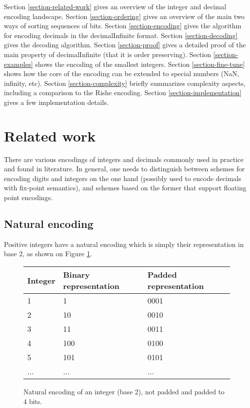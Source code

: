 \documentclass{acm_proc_article-sp}
\begin{document}
Section \ref{section-related-work} gives an overview of the integer and decimal encoding landscape.
Section \ref{section-ordering} gives an overview of the main two ways of sorting sequences of bits.
Section \ref{section-encoding} gives the algorithm for encoding decimals in the decimalInfinite format.
Section \ref{section-decoding} gives the decoding algorithm.
Section \ref{section-proof} gives a detailed proof of the main property of decimalInfinite (that it is order preserving).
Section \ref{section-examples} shows the encoding of the smallest integers.
Section \ref{section-fine-tune} shows how the core of the encoding can be extended to special numbers (NaN, infinity, etc).
Section \ref{section-complexity} briefly summarizes complexity aspects, including a comparison to the Rishe encoding.
Section \ref{section-implementation} gives a few implementation details.

\section{Related work}

There are various encodings of integers and decimals commonly used in practice and found in literature. In general, one needs to distinguish between schemes for encoding digits and integers on the one hand (possibly used to encode decimals with fix-point semantics), and schemes based on the former that support floating point encodings.

\label{section-related-work}

\subsection{Natural encoding}

Positive integers have a natural encoding which is simply their representation in base 2, as shown on Figure \ref{figure-natural-encoding}.

\begin{figure}
\caption{Natural encoding of an integer (base 2), not padded and padded to 4 bits.}
\label{figure-natural-encoding}
\center
\begin{tabular}{|l|l|l|}
\hline
Integer & Binary representation & Padded representation \\
\hline
1 & 1 & 0001 \\
\hline
2 & 10 & 0010 \\
\hline
3 & 11 & 0011\\
\hline
4 & 100  & 0100 \\
\hline
5 & 101  & 0101\\
\hline
... & ... & ... \\
\hline
\end{tabular}
\end{figure}
\end{document}
